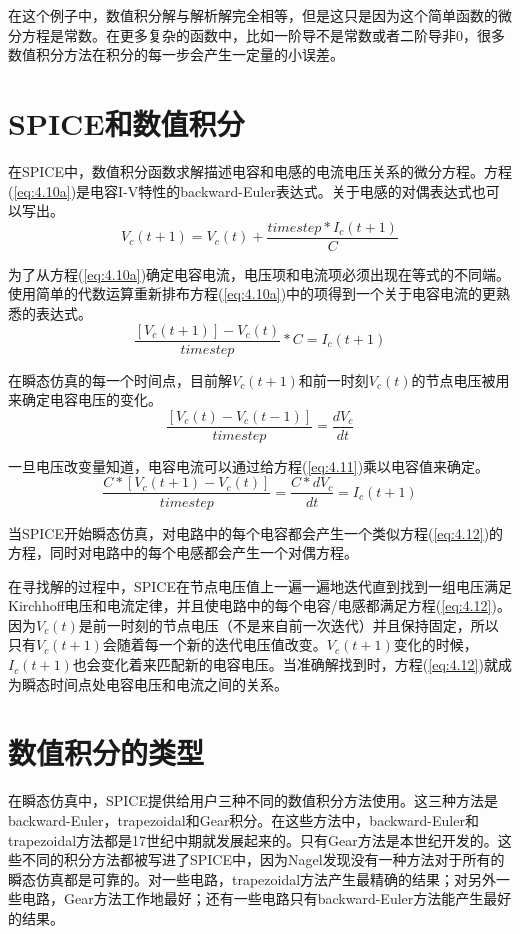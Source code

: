 在这个例子中，数值积分解与解析解完全相等，但是这只是因为这个简单函数的微分方程是常数。在更多复杂的函数中，比如一阶导不是常数或者二阶导非0，很多数值积分方法在积分的每一步会产生一定量的小误差。

\section{SPICE和数值积分}
在SPICE中，数值积分函数求解描述电容和电感的电流电压关系的微分方程。方程(\ref{eq:4.10a})是电容I-V特性的backward-Euler表达式。关于电感的对偶表达式也可以写出。
\begin{equation}
    V_c(t+1)=V_c(t)+\frac{timestep*I_c(t+1)}{C}
    \label{eq:4.10a}
\end{equation}

为了从方程(\ref{eq:4.10a})确定电容电流，电压项和电流项必须出现在等式的不同端。使用简单的代数运算重新排布方程(\ref{eq:4.10a})中的项得到一个关于电容电流的更熟悉的表达式。
\begin{equation}
    \frac{[V_c(t+1)]-V_c(t)}{timestep}*C = I_c(t+1)
    \label{eq:4.10b}
\end{equation}

在瞬态仿真的每一个时间点，目前解$V_c(t+1)$和前一时刻$V_c(t)$的节点电压被用来确定电容电压的变化。
\begin{equation}
    \frac{[V_c(t)-V_c(t-1)]}{timestep}=\frac{dV_c}{dt}
    \label{eq:4.11}
\end{equation}

一旦电压改变量知道，电容电流可以通过给方程(\ref{eq:4.11})乘以电容值来确定。
\begin{equation}
    \frac{C*[V_c(t+1)-V_c(t)]}{timestep}=\frac{C*dV_c}{dt}=I_c(t+1)
    \label{eq:4.12}
\end{equation}

当SPICE开始瞬态仿真，对电路中的每个电容都会产生一个类似方程(\ref{eq:4.12})的方程，同时对电路中的每个电感都会产生一个对偶方程。

在寻找解的过程中，SPICE在节点电压值上一遍一遍地迭代直到找到一组电压满足Kirchhoff电压和电流定律，并且使电路中的每个电容/电感都满足方程(\ref{eq:4.12})。因为$V_c(t)$是前一时刻的节点电压（不是来自前一次迭代）并且保持固定，所以只有$V_c(t+1)$会随着每一个新的迭代电压值改变。$V_c(t+1)$变化的时候，$I_c(t+1)$也会变化着来匹配新的电容电压。当准确解找到时，方程(\ref{eq:4.12})就成为瞬态时间点处电容电压和电流之间的关系。

\section{数值积分的类型}
在瞬态仿真中，SPICE提供给用户三种不同的数值积分方法使用。这三种方法是backward-Euler，trapezoidal和Gear积分。在这些方法中，backward-Euler和trapezoidal方法都是17世纪中期\cite{Euler}就发展起来的。只有Gear方法是本世纪\cite{Gear}开发的。这些不同的积分方法都被写进了SPICE中，因为Nagel\cite{Nagel}发现没有一种方法对于所有的瞬态仿真都是可靠的。对一些电路，trapezoidal方法产生最精确的结果；对另外一些电路，Gear方法工作地最好；还有一些电路只有backward-Euler方法能产生最好的结果。

